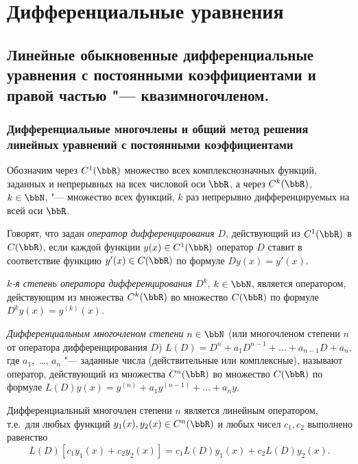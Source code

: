 \part[Дифференциальные уравнения]{Дифференциальные уравнения}

\chapter[Линейные обыкновенные дифференциальные уравнения с постоянными коэффициентами и правой частью "--- квазимногочленом.\protect\newline]{Линейные обыкновенные дифференциальные уравнения с постоянными коэффициентами и правой частью "--- квазимногочленом.}
\section{Дифференциальные многочлены и общий метод решения линейных уравнений с постоянными коэффициентами}
Обозначим через $C^1(\bbR)$ множество всех комплекснозначных функций, заданных и непрерывных на всех числовой оси $\bbR$, а через $C^k(\bbR)$, $k\in \bbN$, "--- множество всех функций, $k$ раз непрерывно дифференцируемых на всей оси $\bbR$.
\begin{defn} \label{ch26.1defn1}
Говорят, что задан \textit{оператор дифференцирования $D$}, действующий из $C^1(\bbR)$ в $C(\bbR)$, если каждой функции $y(x)\in C^1(\bbR)$ оператор $D$ ставит в соответствие функцию $y'(x) \in C(\bbR)$ по формуле $Dy(x)=y'(x)$.
\end{defn}

\begin{defn} \label{ch26.1defn2}
\textit{$k$-я степень оператора дифференцирования $D^k$}, $k\in \bbN$, является оператором, действующим из множества $C^k(\bbR)$ во множество $C(\bbR)$ по формуле $D^ky(x)=y^{(k)}(x)$.
\end{defn}

\begin{defn} \label{ch26.1defn3}
\textit{Дифференциальным многочленом степени} $n \in \bbN$ (или многочленом степени $n$ от оператора дифференцирования $D$) $L(D) = D^n + a_1D^{n-1}+\ldots+a_{n-1}D + a_n$, где $a_1$,~\dots, $a_n$ "--- заданные числа (действительные или комплексные), называют оператор, действующий из множества $C^n(\bbR)$ во множество $C(\bbR)$ по формуле $L(D)y(x)=y^{(n)}+a_1y^{(n-1)}+\ldots+a_ny.$
\end{defn}

\begin{lemm} \label{ch26lemm1.1}
Дифференциальный многочлен степени $n$ является линейным оператором, т.е.~для любых функций $y_1(x),y_2(x)\in C^n(\bbR)$ и любых чисел $c_1,c_2$ выполнено равенство
$$
L(D)[c_1y_1(x)+c_2y_2(x)]=c_1L(D)y_1(x)+c_2L(D)y_2(x).
$$ 
\end{lemm}


